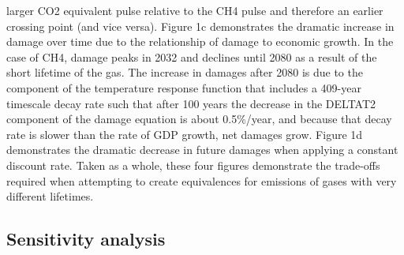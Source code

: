 \documentclass[gc, manuscript]{copernicus}
\begin{document}
larger CO2 equivalent pulse relative to the CH4 pulse and therefore an
earlier crossing point (and vice versa). Figure 1c demonstrates the
dramatic increase in damage over time due to the relationship of damage
to economic growth. In the case of CH4, damage peaks in 2032 and
declines until 2080 as a result of the short lifetime of the gas. The
increase in damages after 2080 is due to the component of the
temperature response function that includes a 409-year timescale decay
rate such that after 100 years the decrease in the DELTAT2 component of
the damage equation is about 0.5\%/year, and because that decay rate is
slower than the rate of GDP growth, net damages grow. Figure 1d
demonstrates the dramatic decrease in future damages when applying a
constant discount rate. Taken as a whole, these four figures demonstrate
the trade-offs required when attempting to create equivalences for
emissions of gases with very different lifetimes.

\subsection{Sensitivity analysis}
\end{document}
